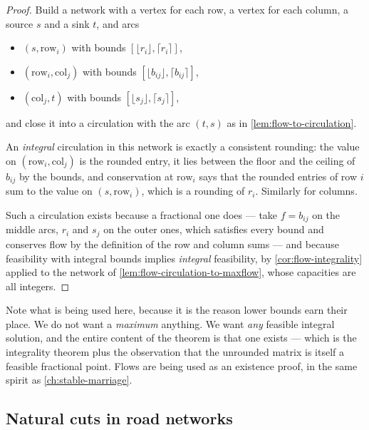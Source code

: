 \begin{proof}
Build a network with a vertex for each row, a vertex for each column, a source
$s$ and a sink $t$, and arcs
\begin{itemize}[nosep]
  \item $(s, \text{row}_i)$ with bounds
        $[\lfloor r_i \rfloor, \lceil r_i \rceil]$,
  \item $(\text{row}_i, \text{col}_j)$ with bounds
        $[\lfloor b_{ij} \rfloor, \lceil b_{ij} \rceil]$,
  \item $(\text{col}_j, t)$ with bounds
        $[\lfloor s_j \rfloor, \lceil s_j \rceil]$,
\end{itemize}
and close it into a circulation with the arc $(t,s)$ as in
\cref{lem:flow-to-circulation}.

An \emph{integral} circulation in this network is exactly a consistent
rounding: the value on $(\text{row}_i,\text{col}_j)$ is the rounded entry, it
lies between the floor and the ceiling of $b_{ij}$ by the bounds, and
conservation at $\text{row}_i$ says that the rounded entries of row $i$ sum to
the value on $(s,\text{row}_i)$, which is a rounding of $r_i$. Similarly for
columns.

Such a circulation exists because a fractional one does --- take
$f = b_{ij}$ on the middle arcs, $r_i$ and $s_j$ on the outer ones, which
satisfies every bound and conserves flow by the definition of the row and column
sums --- and because feasibility with integral bounds implies \emph{integral}
feasibility, by \cref{cor:flow-integrality} applied to the network of
\cref{lem:flow-circulation-to-maxflow}, whose capacities are all integers.
\end{proof}

\begin{intuition}
Note what is being used here, because it is the reason lower bounds earn their
place. We do not want a \emph{maximum} anything. We want \emph{any} feasible
integral solution, and the entire content of the theorem is that one exists ---
which is the integrality theorem plus the observation that the unrounded matrix
is itself a feasible fractional point. Flows are being used as an existence
proof, in the same spirit as \cref{ch:stable-marriage}.
\end{intuition}

\subsection{Natural cuts in road networks}
\label{sec:flow-natural-cuts}


